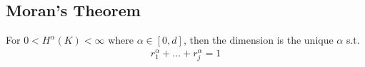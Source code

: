 \subsection{Moran's Theorem}

\begin{theorem}[Moran's 1946]

	For $0 < H^{\alpha} (K) < \infty$ where $\alpha \in [0,d]$, then the dimension is the unique $\alpha$ s.t.
	\begin{align*}
	r_{1}^{\alpha} + \ldots + r_{j}^{\alpha} = 1
	\end{align*} 
	
\end{theorem}

